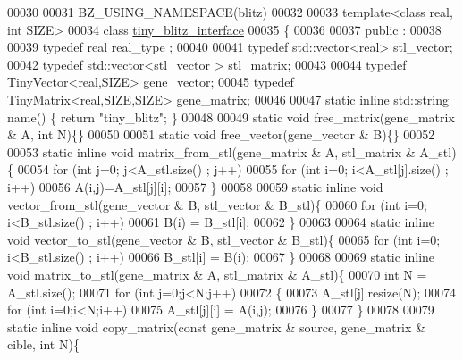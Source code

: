 \begin{DoxyCode}
00030 
00031 BZ\_USING\_NAMESPACE(blitz)
00032 
00033 \textcolor{keyword}{template}<\textcolor{keyword}{class} real, \textcolor{keywordtype}{int} SIZE>
00034 \textcolor{keyword}{class }\hyperlink{classtiny__blitz__interface}{tiny\_blitz\_interface}
00035 \{
00036 
00037 public :
00038 
00039   \textcolor{keyword}{typedef} real real\_type ;
00040 
00041   \textcolor{keyword}{typedef} std::vector<real>  stl\_vector;
00042   \textcolor{keyword}{typedef} std::vector<stl\_vector > stl\_matrix;
00043 
00044   \textcolor{keyword}{typedef} TinyVector<real,SIZE> gene\_vector;
00045   \textcolor{keyword}{typedef} TinyMatrix<real,SIZE,SIZE> gene\_matrix;
00046 
00047   \textcolor{keyword}{static} \textcolor{keyword}{inline} std::string name() \{ \textcolor{keywordflow}{return} \textcolor{stringliteral}{"tiny\_blitz"}; \}
00048 
00049   \textcolor{keyword}{static} \textcolor{keywordtype}{void} free\_matrix(gene\_matrix & A, \textcolor{keywordtype}{int} N)\{\}
00050 
00051   \textcolor{keyword}{static} \textcolor{keywordtype}{void} free\_vector(gene\_vector & B)\{\}
00052 
00053   \textcolor{keyword}{static} \textcolor{keyword}{inline} \textcolor{keywordtype}{void} matrix\_from\_stl(gene\_matrix & A, stl\_matrix & A\_stl)\{
00054     \textcolor{keywordflow}{for} (\textcolor{keywordtype}{int} j=0; j<A\_stl.size() ; j++)
00055       \textcolor{keywordflow}{for} (\textcolor{keywordtype}{int} i=0; i<A\_stl[j].size() ; i++)
00056         A(i,j)=A\_stl[j][i];
00057   \}
00058 
00059   \textcolor{keyword}{static} \textcolor{keyword}{inline} \textcolor{keywordtype}{void} vector\_from\_stl(gene\_vector & B, stl\_vector & B\_stl)\{
00060     \textcolor{keywordflow}{for} (\textcolor{keywordtype}{int} i=0; i<B\_stl.size() ; i++)
00061       B(i) = B\_stl[i];
00062   \}
00063 
00064   \textcolor{keyword}{static} \textcolor{keyword}{inline} \textcolor{keywordtype}{void} vector\_to\_stl(gene\_vector & B, stl\_vector & B\_stl)\{
00065     \textcolor{keywordflow}{for} (\textcolor{keywordtype}{int} i=0; i<B\_stl.size() ; i++)
00066       B\_stl[i] = B(i);
00067   \}
00068 
00069   \textcolor{keyword}{static} \textcolor{keyword}{inline} \textcolor{keywordtype}{void} matrix\_to\_stl(gene\_matrix & A, stl\_matrix & A\_stl)\{
00070     \textcolor{keywordtype}{int} N = A\_stl.size();
00071     \textcolor{keywordflow}{for} (\textcolor{keywordtype}{int} j=0;j<N;j++)
00072     \{
00073       A\_stl[j].resize(N);
00074       \textcolor{keywordflow}{for} (\textcolor{keywordtype}{int} i=0;i<N;i++)
00075         A\_stl[j][i] = A(i,j);
00076     \}
00077   \}
00078 
00079   \textcolor{keyword}{static} \textcolor{keyword}{inline} \textcolor{keywordtype}{void} copy\_matrix(\textcolor{keyword}{const} gene\_matrix & source, gene\_matrix & cible, \textcolor{keywordtype}{int} N)\{

\end{DoxyCode}
